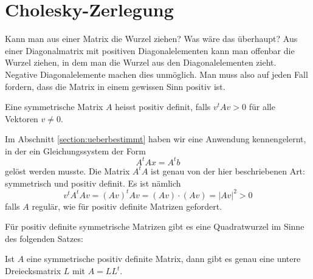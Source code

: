 %
%
%
\section{Cholesky-Zerlegung}
Kann man aus einer Matrix die Wurzel ziehen? Was wäre das überhaupt?
Aus einer Diagonalmatrix mit positiven Diagonalelementen kann man offenbar
die Wurzel ziehen, in dem man die Wurzel aus den Diagonalelementen zieht.
Negative Diagonalelemente machen dies unmöglich.
Man muss also auf jeden
Fall fordern, dass die Matrix in einem gewissen Sinn positiv ist.

\begin{definition}
Eine symmetrische Matrix $A$ heisst positiv definit, falls $v^tAv>0$ für
alle Vektoren $v\ne 0$.
\end{definition}

Im Abschnitt \ref{section:ueberbestimmt} haben wir eine Anwendung
kennengelernt, in der ein Gleichungssystem der Form
\[
A^tAx=A^t b
\]
gelöst werden musste.
Die Matrix $A^tA$ ist genau von der hier
beschriebenen Art: symmetrisch und positiv definit.
Es ist nämlich
\[
v^tA^tAv=(Av)^tAv=(Av)\cdot (Av)=|Av|^2> 0
\]
falls $A$ regulär, wie für positiv definite Matrizen gefordert.

Für positiv definite symmetrische Matrizen gibt es eine Quadratwurzel
im Sinne des folgenden Satzes:
\begin{satz}
Ist $A$ eine symmetrische positiv definite Matrix, dann gibt es genau eine
untere Dreiecksmatrix $L$ mit $A=LL^t$.
\end{satz}

